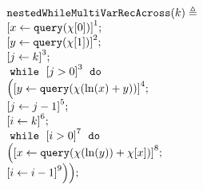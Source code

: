                         \begin{example}
                            \[
                            \begin{array}{l}
                            \kw{nestedWhileMultiVarRecAcross}(k) \triangleq \\
                                \clabel{ \assign{x}{\query(\chi[0])}}^{1} ; \\
                                \clabel{ \assign{y}{\query(\chi[1])}}^{2} ; \\
                                \clabel{\assign{j}{k} }^{3} ; \\
                                    \ewhile ~ \clabel{j > 0}^{3} ~ \edo ~ \\
                                    \Big(
                                     \clabel{\assign{y}{\query(\chi(\ln(x) + y))} }^{4}  ; \\
                                     \clabel{\assign{j}{j-1}}^{5} ;\\
                                     \clabel{\assign{i}{k}}^{6} ;\\
                                     \ewhile ~ \clabel{i > 0}^{7} ~ \edo ~ \\
                                     \Big(
                                      \clabel{\assign{x}{\query(\chi(\ln(y))+\chi[x])} }^{8}  ; \\
                                      \clabel{\assign{i}{i-1}}^{9}
                                      \Big) \Big);
                                \end{array}
                            \]
                            \end{example}
                    
                            